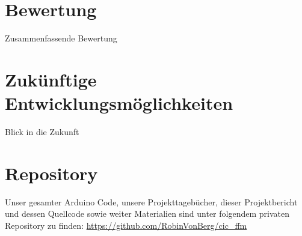 \chapter{Bewertung}

    Zusammenfassende Bewertung


\chapter{Zukünftige Entwicklungsmöglichkeiten}

    Blick in die Zukunft


\chapter{Repository}

    Unser gesamter Arduino Code, unsere Projekttagebücher, dieser Projektbericht und dessen Quellcode sowie weiter Materialien sind unter folgendem privaten Repository zu finden: \url{https://github.com/RobinVonBerg/cic_ffm}

    